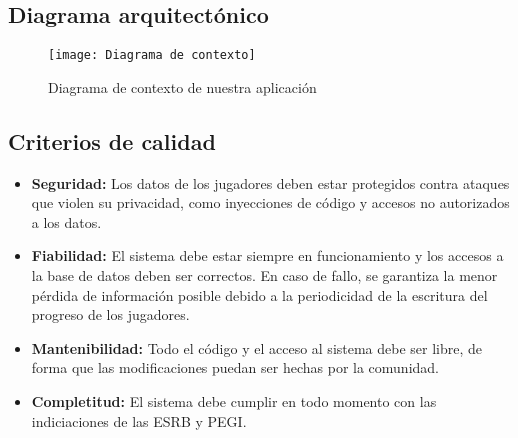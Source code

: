 \subsection{Diagrama arquitectónico}

\begin{figure}[!ht]
\begin{center}
	\texttt{[image: Diagrama de contexto]}
\end{center}
\caption{Diagrama de contexto de nuestra aplicación}
\end{figure}

\subsection{Criterios de calidad}

\begin{itemize}
	\item
		\textbf{Seguridad:}
		Los datos de los jugadores deben estar protegidos contra ataques que violen su privacidad, como inyecciones de código y accesos no autorizados a los datos.
	\item
		\textbf{Fiabilidad:}
		El sistema debe estar siempre en funcionamiento y los accesos a la base de datos deben ser correctos.
		En caso de fallo, se garantiza la menor pérdida de información posible debido a la periodicidad de la escritura del progreso de los jugadores.
	\item
		\textbf{Mantenibilidad:}
		Todo el código y el acceso al sistema debe ser libre, de forma que las modificaciones puedan ser hechas por la comunidad.
	\item
		\textbf{Completitud:}
		El sistema debe cumplir en todo momento con las indiciaciones de las ESRB y PEGI\@.
\end{itemize}
